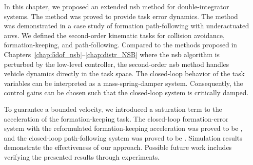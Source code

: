 In this chapter, we proposed an extended \gls{nsb} method for double-integrator systems. The method was proved to provide  task error dynamics. The method was demonstrated in a case study of formation path-following with underactuated \glspl{auv}. We defined the second-order kinematic tasks for collision avoidance, formation-keeping, and path-following. 
Compared to the methods proposed in Chapters~\ref{chap:5dof_nsb}--\ref{chap:distr_NSB} where the \gls{nsb} algorithm is perturbed by the low-level controller, the second-order \gls{nsb} method handles vehicle dynamics directly in the task space. The closed-loop behavior of the task variables can be interpreted as a mass-spring-damper system. Consequently, the control gains can be chosen such that the closed-loop system is critically damped.

To guarantee a bounded velocity, we introduced a saturation term to the acceleration of the formation-keeping task. The closed-loop formation-error system with the reformulated formation-keeping acceleration was proved to be , and the closed-loop path-following system was proved to be . Simulation results demonstrate the effectiveness of our approach. Possible future work includes verifying the presented results through experiments.
